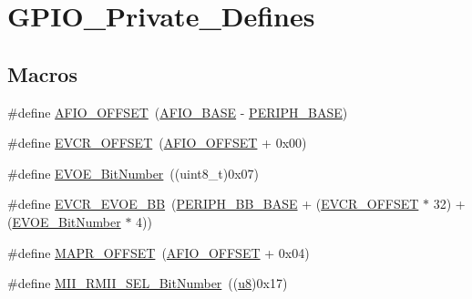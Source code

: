 \hypertarget{group___g_p_i_o___private___defines}{}\section{G\+P\+I\+O\+\_\+\+Private\+\_\+\+Defines}
\label{group___g_p_i_o___private___defines}
\subsection*{Macros}
\begin{DoxyCompactItemize}
\item 
\#define \mbox{\hyperlink{group___g_p_i_o___private___defines_ga0ecdd0dd5180e1ee385c22f66a2cd660}{A\+F\+I\+O\+\_\+\+O\+F\+F\+S\+ET}}~(\mbox{\hyperlink{group___peripheral__memory__map_ga5f7e3eacfcf4c313c25012795148a680}{A\+F\+I\+O\+\_\+\+B\+A\+SE}} -\/ \mbox{\hyperlink{group___peripheral__memory__map_ga9171f49478fa86d932f89e78e73b88b0}{P\+E\+R\+I\+P\+H\+\_\+\+B\+A\+SE}})
\item 
\#define \mbox{\hyperlink{group___g_p_i_o___private___defines_gaf8c24f39392c89142f1b97a418669d5d}{E\+V\+C\+R\+\_\+\+O\+F\+F\+S\+ET}}~(\mbox{\hyperlink{group___g_p_i_o___private___defines_ga0ecdd0dd5180e1ee385c22f66a2cd660}{A\+F\+I\+O\+\_\+\+O\+F\+F\+S\+ET}} + 0x00)
\item 
\#define \mbox{\hyperlink{group___g_p_i_o___private___defines_ga8e4fdee57fe3447cdbc5d00ccab60c18}{E\+V\+O\+E\+\_\+\+Bit\+Number}}~((uint8\+\_\+t)0x07)
\item 
\#define \mbox{\hyperlink{group___g_p_i_o___private___defines_ga6e4f8c4e3def38811ac6c03b4f64240b}{E\+V\+C\+R\+\_\+\+E\+V\+O\+E\+\_\+\+BB}}~(\mbox{\hyperlink{group___peripheral__memory__map_gaed7efc100877000845c236ccdc9e144a}{P\+E\+R\+I\+P\+H\+\_\+\+B\+B\+\_\+\+B\+A\+SE}} + (\mbox{\hyperlink{group___g_p_i_o___private___defines_gaf8c24f39392c89142f1b97a418669d5d}{E\+V\+C\+R\+\_\+\+O\+F\+F\+S\+ET}} $\ast$ 32) + (\mbox{\hyperlink{group___g_p_i_o___private___defines_ga8e4fdee57fe3447cdbc5d00ccab60c18}{E\+V\+O\+E\+\_\+\+Bit\+Number}} $\ast$ 4))
\item 
\#define \mbox{\hyperlink{group___g_p_i_o___private___defines_ga472f80f63d09e365d283675f3466c8a1}{M\+A\+P\+R\+\_\+\+O\+F\+F\+S\+ET}}~(\mbox{\hyperlink{group___g_p_i_o___private___defines_ga0ecdd0dd5180e1ee385c22f66a2cd660}{A\+F\+I\+O\+\_\+\+O\+F\+F\+S\+ET}} + 0x04)
\item 
\#define \mbox{\hyperlink{group___g_p_i_o___private___defines_gad4a9bbd669109039291f942d923ff8ae}{M\+I\+I\+\_\+\+R\+M\+I\+I\+\_\+\+S\+E\+L\+\_\+\+Bit\+Number}}~((\mbox{\hyperlink{group___exported__types_ga92c50087ca0e64fa93fc59402c55f8ca}{u8}})0x17)

\end{DoxyCompactItemize}
